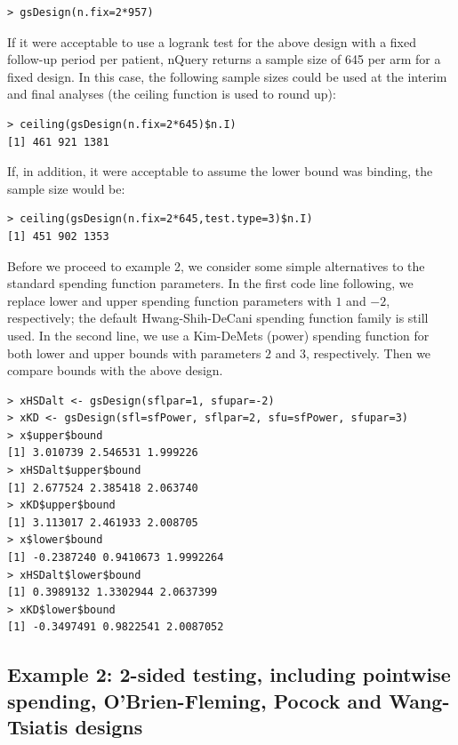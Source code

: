 \bigskip

\begin{verbatim}
> gsDesign(n.fix=2*957)
\end{verbatim}
\bigskip

If it were acceptable to use a logrank test for the above design with a fixed
follow-up period per patient, nQuery returns a sample size of 645 per arm for
a fixed design. In this case, the following sample sizes could be used at the
interim and final analyses (the ceiling function is used to round up):

\bigskip

\begin{verbatim}
> ceiling(gsDesign(n.fix=2*645)$n.I)
[1] 461 921 1381
\end{verbatim}
\bigskip

If, in addition, it were acceptable to assume the lower bound was binding, the
sample size would be:

\bigskip

\begin{verbatim}
> ceiling(gsDesign(n.fix=2*645,test.type=3)$n.I)
[1] 451 902 1353
\end{verbatim}
\bigskip

Before we proceed to example 2, we consider some simple alternatives to the
standard spending function parameters. In the first code line following, we
replace lower and upper spending function parameters with $1$ and $-2$,
respectively; the default Hwang-Shih-DeCani spending function family is still
used. In the second line, we use a Kim-DeMets (power) spending function for
both lower and upper bounds with parameters $2$ and $3$, respectively. Then we
compare bounds with the above design.

\bigskip

\begin{verbatim}
> xHSDalt <- gsDesign(sflpar=1, sfupar=-2)
> xKD <- gsDesign(sfl=sfPower, sflpar=2, sfu=sfPower, sfupar=3)
> x$upper$bound
[1] 3.010739 2.546531 1.999226
> xHSDalt$upper$bound
[1] 2.677524 2.385418 2.063740
> xKD$upper$bound
[1] 3.113017 2.461933 2.008705
> x$lower$bound
[1] -0.2387240 0.9410673 1.9992264
> xHSDalt$lower$bound
[1] 0.3989132 1.3302944 2.0637399
> xKD$lower$bound
[1] -0.3497491 0.9822541 2.0087052
\end{verbatim}

\subsection*{Example 2: 2-sided testing, including pointwise spending,
O'Brien-Fleming, Pocock and Wang-Tsiatis designs}


